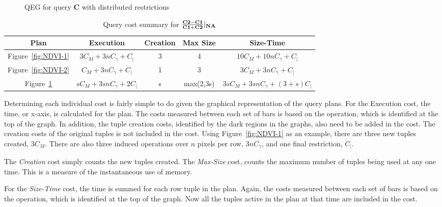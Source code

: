\documentclass{ucdthesis}       %
\newcommand{\Tb}[2][]{ \TR[#1]{\psframebox{\rule{0pt}{9pt}#2}} }
\newcommand{\qry}[1]{{\bf #1}}
\begin{document}
\begin{figure}[htb]
  \centering
  \pstree[treemode=U,nodesep=2pt,levelsep=30pt]{\TR{Q}}{
    \pstree[treemode=U]{\Tcircle{$f()$}}
    {
      \pstree[treemode=U]{\Tb{$|_{NA}$}}{\TR[name=C1]{\im{C1}}}
      \pstree[treemode=U]{\Tb{$|_{NA}$}}{\TR[name=C1]{\im{C2}}}
    }
  }
  \quad
  
\caption{\ac{QEG} for query \qry{C} with distributed restrictions}
\label{fig:NDVI-3}
\end{figure}
%
\begin{table}[htb]
  \centering
  \caption{Query cost summary for $\frac{{\bf{C2}}-{\bf{C1}}}{{\bf{C1}}+{\bf{C2}}}|_{{\bf{NA}}} $}
  \begin{tabular}{c|c|c|c|c}
    Plan & Execution & Creation & Max Size & Size-Time \\
    \hline \hline
    Figure~\ref{fig:NDVI-1} & $3 C_{M} + 3 n C_{\gamma} + C_{|}$ & 3 & 4 & $10 C_{M} + 10 n C_{\gamma} + C_{|}$ \\
    Figure~\ref{fig:NDVI-2} & $C_{M} + 3 n C_{\gamma} + C_{|}$ & 1 & 3 & $3 C_{M} + 3 n C_{\gamma} + C_{|}$ \\
    Figure~\ref{fig:NDVI-3} & $s C_{M} + 3 s n C_{\gamma} + 2 C_{|}$ & s & max(2,3s) & $3 s C_{M} + 3 s n C_{\gamma} + (3+s) C_{|}$ 
  \end{tabular}
  \label{tab:ndvi-summary}
\end{table}

Determining each individual cost is fairly simple to do given the
graphical representation of the query plans.  For the Execution cost,
the time, or x-axis, is calculated for the plan.  The costs measured
between each set of bars is based on the operation, which is
identified at the top of the graph.  In addition, the tuple creation
costs, identified by the dark regions in the graphs, also need to be
added in the cost.  The creation costs of the original tuples is not
included in the cost. Using Figure~\ref{fig:NDVI-1} as an example,
there are three new tuples created, $3 C_{M}$.  There are also three
induced operations over $n$ pixels per row, $3 n  C_{\gamma}$, and one
final restriction, $C_{|}$.

The \emph{Creation} cost simply counts the new tuples created.  The
\emph{Max-Size} cost, counts the maximum number of tuples being used
at any one time.  This is a measure of the instantaneous use of
memory.

For the \emph{Size-Time} cost, the time is summed for each row tuple
in the plan.  Again, the costs measured between each set of bars is
based on the operation, which is identified at the top of the graph.
Now all the tuples active in the plan at that time are included in the
cost.
\end{document}
